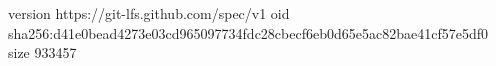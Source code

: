 version https://git-lfs.github.com/spec/v1
oid sha256:d41e0bead4273e03cd965097734fdc28cbecf6eb0d65e5ac82bae41cf57e5df0
size 933457
